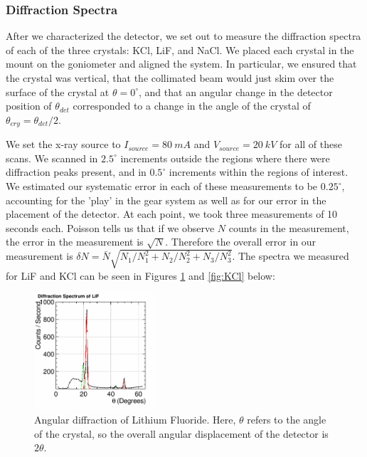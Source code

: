 \documentclass[%
 reprint,
 amsmath,amssymb,
 aps,
 pra,
]{revtex4-1}
\begin{document}
\subsubsection{Diffraction Spectra}

After we characterized the detector, we set out to measure the diffraction spectra of each of the three crystals: KCl, LiF, and NaCl. We placed each crystal in the mount on the goniometer and aligned the system. In particular, we ensured that the crystal was vertical, that the collimated beam would just skim over the surface of the crystal at $\theta = 0^\circ$, and that an angular change in the detector position of $\theta_{det}$ corresponded to a change in the angle of the crystal of $\theta_{cry} = \theta_{det}/2$. 

We set the x-ray source to $I_{source} = 80~mA$ and $V_{source} = 20~kV$ for all of these scans. We scanned in $2.5^\circ$ increments outside the regions where there were diffraction peaks present, and in $0.5^\circ$ increments within the regions of interest. We estimated our systematic error in each of these measurements to be $0.25^\circ$, accounting for the 'play' in the gear system as well as for our error in the placement of the detector. At each point, we took three measurements of 10 seconds each. Poisson tells us that if we observe $N$ counts in the measurement, the error in the measurement is $\sqrt{N}$. Therefore the overall error in our measurement is $\delta N =\bar{N}\sqrt{N_1/N_1^2 + N_2/N_2^2 + N_3/N_3^2}$. The spectra we measured for LiF and KCl can be seen in Figures \ref{fig:LiF} and \ref{fig:KCl} below:

\begin{figure}[H]
	\centering
	\includegraphics[width=0.4\textwidth]{Diffraction_LiF.png}
	\caption{Angular diffraction of Lithium Fluoride. Here, $\theta$ refers to the angle of the crystal, so the overall angular displacement of the detector is $2 \theta$.}
	\label{fig:LiF}
\end{figure}
\end{document}
